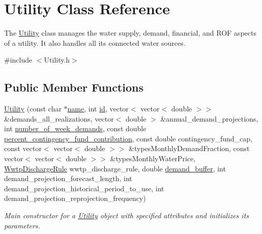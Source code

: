 \hypertarget{classUtility}{}\section{Utility Class Reference}
\label{classUtility}


The {\ttfamily \mbox{\hyperlink{classUtility}{Utility}}} class manages the water supply, demand, financial, and R\+OF aspects of a utility. It also handles all its connected water sources.  




{\ttfamily \#include $<$Utility.\+h$>$}

\subsection*{Public Member Functions}
\begin{DoxyCompactItemize}
\item 
\mbox{\hyperlink{classUtility_a53fb19e5a344de5892c5cfbcc1225da9}{Utility}} (const char $\ast$\mbox{\hyperlink{classUtility_ad0ce5c179a7f5ceb46d4fcae08dbfb47}{name}}, int \mbox{\hyperlink{classUtility_ad41c4ea5c911c5000452a3371cd65d5f}{id}}, vector$<$ vector$<$ double $>$$>$ \&demands\+\_\+all\+\_\+realizations, vector$<$ double $>$ \&annual\+\_\+demand\+\_\+projections, int \mbox{\hyperlink{classUtility_a0548db3746582251082aa430db49dad0}{number\+\_\+of\+\_\+week\+\_\+demands}}, const double \mbox{\hyperlink{classUtility_a7b1a097ec188be8e7175d058b5e6596c}{percent\+\_\+contingency\+\_\+fund\+\_\+contribution}}, const double contingency\+\_\+fund\+\_\+cap, const vector$<$ vector$<$ double $>$$>$ \&types\+Monthly\+Demand\+Fraction, const vector$<$ vector$<$ double $>$$>$ \&types\+Monthly\+Water\+Price, \mbox{\hyperlink{classWwtpDischargeRule}{Wwtp\+Discharge\+Rule}} wwtp\+\_\+discharge\+\_\+rule, double \mbox{\hyperlink{classUtility_a4be9760339ec06e5c932890da8e566b3}{demand\+\_\+buffer}}, int demand\+\_\+projection\+\_\+forecast\+\_\+length, int demand\+\_\+projection\+\_\+historical\+\_\+period\+\_\+to\+\_\+use, int demand\+\_\+projection\+\_\+reprojection\+\_\+frequency)
\begin{DoxyCompactList}\small\item\em Main constructor for a \mbox{\hyperlink{classUtility}{Utility}} object with specified attributes and initializes its parameters. \end{DoxyCompactList}\item 
$$
\end{DoxyCompactItemize}
